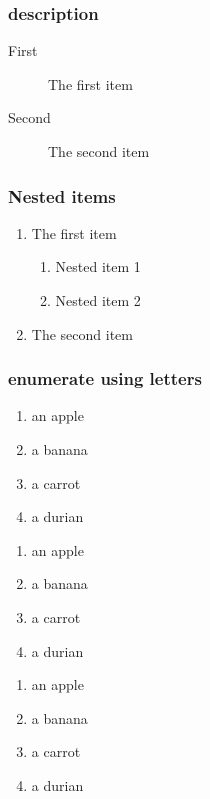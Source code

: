 \documentclass[12pt]{article}
\begin{document}
\subsubsection{description}

\begin{description}
\item[First] The first item
\item[Second] The second item
\end{description}

\subsubsection{Nested items}

\begin{enumerate}
  \item The first item
  \begin{enumerate}
    \item Nested item 1
    \item Nested item 2
  \end{enumerate}
  \item The second item
\end{enumerate}

\subsubsection{enumerate using letters}

\begin{enumerate}[label=(\alph*)]
\item an apple
\item a banana
\item a carrot
\item a durian
\end{enumerate}
\vspace{0.05\textheight}
\begin{enumerate}[label=(\Alph*)]
\item an apple
\item a banana
\item a carrot
\item a durian
\end{enumerate}
\vspace{0.05\textheight}
\begin{enumerate}[label=(\roman*)]
\item an apple
\item a banana
\item a carrot
\item a durian
\end{enumerate}
\end{document}
